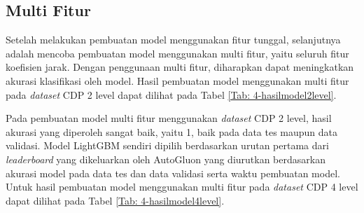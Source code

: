 \subsection{Multi Fitur}
Setelah melakukan pembuatan model menggunakan fitur tunggal, selanjutnya adalah mencoba pembuatan model menggunakan multi fitur, yaitu seluruh fitur koefisien
jarak. Dengan penggunaan multi fitur, diharapkan dapat meningkatkan akurasi klasifikasi oleh model. Hasil pembuatan model menggunakan multi fitur pada
\emph{dataset} CDP 2 level dapat dilihat pada Tabel \ref{Tab: 4-hasilmodel2level}.

\begin{table}[!ht]
	\centering
	\caption{Hasil pembuatan model multi fitur pada \emph{dataset} CDP 2 level}
	\vspace{0.5em}
	\label{Tab: 4-hasilmodel2level}
\end{table}

\noindent Pada pembuatan model multi fitur menggunakan \emph{dataset} CDP 2 level, hasil akurasi yang diperoleh sangat baik, yaitu 1, baik pada data tes maupun data validasi. Model LightGBM sendiri dipilih berdasarkan urutan pertama dari \emph{leaderboard} yang dikeluarkan oleh AutoGluon yang diurutkan berdasarkan akurasi model pada data tes dan data validasi serta waktu pembuatan model. Untuk hasil pembuatan model menggunakan multi fitur pada \emph{dataset} CDP 4 level dapat dilihat pada Tabel \ref{Tab: 4-hasilmodel4level}.

